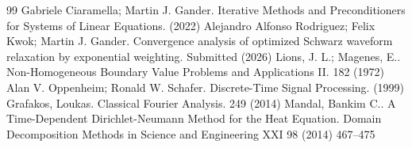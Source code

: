 \documentclass[10pt,a4paper]{amsart}
\begin{document}
\begin{thebibliography}{99}
 Gabriele Ciaramella; Martin J. Gander. Iterative Methods and Preconditioners for Systems of Linear Equations. (2022)
 Alejandro Alfonso Rodriguez; Felix Kwok; Martin J. Gander. Convergence analysis of optimized {S}chwarz waveform relaxation by exponential weighting. Submitted (2026)
 Lions, J. L.; Magenes, E.. Non-Homogeneous Boundary Value Problems and Applications II. 182 (1972)
 Alan V. Oppenheim; Ronald W. Schafer. Discrete-Time Signal Processing. (1999)
 Grafakos, Loukas. Classical Fourier Analysis. 249 (2014)
 Mandal, Bankim C.. A Time-Dependent {D}irichlet-{N}eumann Method for the Heat Equation. Domain Decomposition Methods in Science and Engineering XXI 98 (2014) 467--475
\end{thebibliography}
\end{document}
